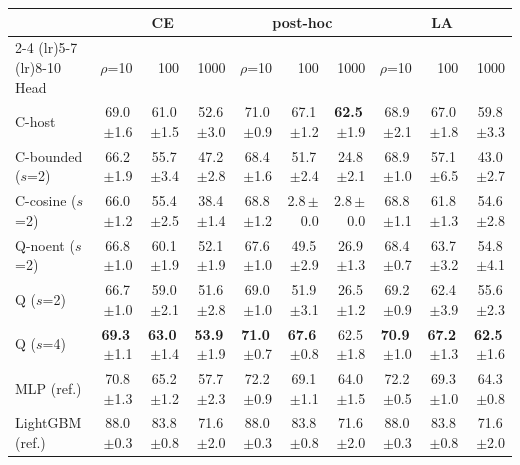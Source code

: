 \begin{tabular}{lrrrrrrrrr}
\toprule
 & \multicolumn{3}{c}{CE} & \multicolumn{3}{c}{post-hoc} & \multicolumn{3}{c}{LA} \\
\cmidrule(lr){2-4} \cmidrule(lr){5-7} \cmidrule(lr){8-10}
Head & $\rho$=10 & 100 & 1000 & $\rho$=10 & 100 & 1000 & $\rho$=10 & 100 & 1000 \\
\midrule
C-host & 69.0\,{\scriptsize$\pm$1.6} & 61.0\,{\scriptsize$\pm$1.5} & 52.6\,{\scriptsize$\pm$3.0} & 71.0\,{\scriptsize$\pm$0.9} & 67.1\,{\scriptsize$\pm$1.2} & \textbf{62.5}\,{\scriptsize$\pm$1.9} & 68.9\,{\scriptsize$\pm$2.1} & 67.0\,{\scriptsize$\pm$1.8} & 59.8\,{\scriptsize$\pm$3.3} \\
C-bounded ($s$=2) & 66.2\,{\scriptsize$\pm$1.9} & 55.7\,{\scriptsize$\pm$3.4} & 47.2\,{\scriptsize$\pm$2.8} & 68.4\,{\scriptsize$\pm$1.6} & 51.7\,{\scriptsize$\pm$2.4} & 24.8\,{\scriptsize$\pm$2.1} & 68.9\,{\scriptsize$\pm$1.0} & 57.1\,{\scriptsize$\pm$6.5} & 43.0\,{\scriptsize$\pm$2.7} \\
C-cosine ($s$=2) & 66.0\,{\scriptsize$\pm$1.2} & 55.4\,{\scriptsize$\pm$2.5} & 38.4\,{\scriptsize$\pm$1.4} & 68.8\,{\scriptsize$\pm$1.2} & 2.8\,{\scriptsize$\pm$0.0} & 2.8\,{\scriptsize$\pm$0.0} & 68.8\,{\scriptsize$\pm$1.1} & 61.8\,{\scriptsize$\pm$1.3} & 54.6\,{\scriptsize$\pm$2.8} \\
Q-noent ($s$=2) & 66.8\,{\scriptsize$\pm$1.0} & 60.1\,{\scriptsize$\pm$1.9} & 52.1\,{\scriptsize$\pm$1.9} & 67.6\,{\scriptsize$\pm$1.0} & 49.5\,{\scriptsize$\pm$2.9} & 26.9\,{\scriptsize$\pm$1.3} & 68.4\,{\scriptsize$\pm$0.7} & 63.7\,{\scriptsize$\pm$3.2} & 54.8\,{\scriptsize$\pm$4.1} \\
Q ($s$=2) & 66.7\,{\scriptsize$\pm$1.0} & 59.0\,{\scriptsize$\pm$2.1} & 51.6\,{\scriptsize$\pm$2.8} & 69.0\,{\scriptsize$\pm$1.0} & 51.9\,{\scriptsize$\pm$3.1} & 26.5\,{\scriptsize$\pm$1.2} & 69.2\,{\scriptsize$\pm$0.9} & 62.4\,{\scriptsize$\pm$3.9} & 55.6\,{\scriptsize$\pm$2.3} \\
Q ($s$=4) & \textbf{69.3}\,{\scriptsize$\pm$1.1} & \textbf{63.0}\,{\scriptsize$\pm$1.4} & \textbf{53.9}\,{\scriptsize$\pm$1.9} & \textbf{71.0}\,{\scriptsize$\pm$0.7} & \textbf{67.6}\,{\scriptsize$\pm$0.8} & 62.5\,{\scriptsize$\pm$1.8} & \textbf{70.9}\,{\scriptsize$\pm$1.0} & \textbf{67.2}\,{\scriptsize$\pm$1.3} & \textbf{62.5}\,{\scriptsize$\pm$1.6} \\
\midrule
MLP (ref.) & 70.8\,{\scriptsize$\pm$1.3} & 65.2\,{\scriptsize$\pm$1.2} & 57.7\,{\scriptsize$\pm$2.3} & 72.2\,{\scriptsize$\pm$0.9} & 69.1\,{\scriptsize$\pm$1.1} & 64.0\,{\scriptsize$\pm$1.5} & 72.2\,{\scriptsize$\pm$0.5} & 69.3\,{\scriptsize$\pm$1.0} & 64.3\,{\scriptsize$\pm$0.8} \\
LightGBM (ref.) & 88.0\,{\scriptsize$\pm$0.3} & 83.8\,{\scriptsize$\pm$0.8} & 71.6\,{\scriptsize$\pm$2.0} & 88.0\,{\scriptsize$\pm$0.3} & 83.8\,{\scriptsize$\pm$0.8} & 71.6\,{\scriptsize$\pm$2.0} & 88.0\,{\scriptsize$\pm$0.3} & 83.8\,{\scriptsize$\pm$0.8} & 71.6\,{\scriptsize$\pm$2.0} \\
\bottomrule
\end{tabular}